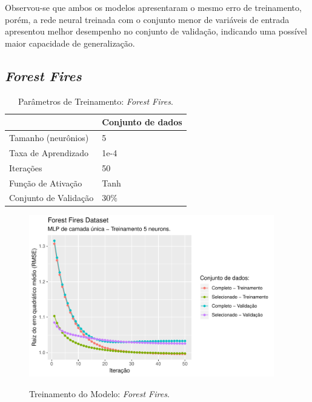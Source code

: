Observou-se que ambos os modelos apresentaram o mesmo erro de treinamento, porém, a rede neural treinada com o conjunto menor de variáveis de entrada apresentou melhor desempenho no conjunto de validação, indicando uma possível maior capacidade de generalização.


\FloatBarrier
\subsection{\textit{Forest Fires}}

\begin{table}[!htb]
    \caption{Parâmetros de Treinamento: \textit{Forest Fires}.}
    \begin{center}
        \begin{tabular}{@{}ll@{}}
        \toprule
                            & Conjunto de dados \\ \midrule
        Tamanho (neurônios)     & 5                 \\
        Taxa de Aprendizado   & 1e-4              \\
        Iterações             & 50                \\
        Função de Ativação    & Tanh              \\
        Conjunto de Validação & $30\%$            \\ \bottomrule
        \end{tabular}
    \end{center}
    \label{tbl:treinamento_forest}
\end{table}

\begin{figure}[!htb]
    \centering
    \caption{Treinamento do Modelo: \textit{Forest Fires}.}
    \includegraphics[height=200pt]{imgs/res/ForestFiresDataset_model.pdf}
    \label{fig:modelo_ForestFiresDataset_model}
\end{figure}


